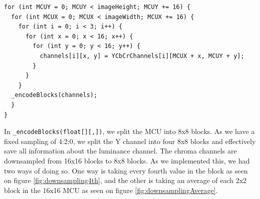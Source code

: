 \begin{lstlisting}[firstnumber=540, label=JPEGEncodeAndQuantize, caption={Shows how the image is divided into MCUs \textbf{File: }JPEGImage.cs}]
for (int MCUY = 0; MCUY < imageHeight; MCUY += 16) {
  for (int MCUX = 0; MCUX < imageWidth; MCUX += 16) {
    for (int i = 0; i < 3; i++) {
      for (int x = 0; x < 16; x++) {
        for (int y = 0; y < 16; y++) {
          channels[i][x, y] = YCbCrChannels[i][MCUX + x, MCUY + y];
        }
      }
    }
  _encodeBlocks(channels);
  }
}
\end{lstlisting}

In \lstinline|_encodeBlocks(float[][,])|, we split the MCU into 8x8 blocks.
As we have a fixed sampling of 4:2:0, we split the Y channel into four 8x8 blocks and effectively save all information about the luminance channel. The chroma channels are downsampled from 16x16 blocks to 8x8 blocks.
As we implemented this, we had two ways of doing so.
One way is taking every fourth value in the block as seen on figure \ref{fig:downsampling4th}, and the other is taking an average of each 2x2 block in the 16x16 MCU as seen on figure \ref{fig:downsamplingAverage}.

